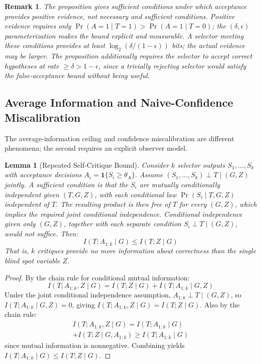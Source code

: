 \documentclass[a4paper,journal]{IAENGtran}
\newtheorem{Lemma}[Theorem]{Lemma}
\newtheorem{Remark}[Theorem]{Remark}
\begin{document}
\begin{Remark}
The proposition gives \emph{sufficient} conditions under which acceptance provides positive
evidence, not necessary and sufficient conditions. Positive evidence requires only
$\Pr(A=1 \mid T=1) > \Pr(A=1 \mid T=0)$; the $(\delta, \epsilon)$ parameterization makes
the bound explicit and measurable. A selector meeting these conditions provides at least
$\log_2(\delta/(1-\epsilon))$ bits; the actual evidence may be larger. The proposition
additionally requires the selector to accept correct hypotheses at rate $\geq \delta >
1-\epsilon$, since a trivially rejecting selector would satisfy the false-acceptance bound
without being useful.
\end{Remark}

\subsection{Average Information and Naive-Confidence Miscalibration}

The average-information ceiling and confidence miscalibration are different phenomena;
the second requires an explicit observer model.

\begin{Lemma}[Repeated Self-Critique Bound]
\label{lem:repeated}
Consider $k$ selector outputs $S_1, \ldots, S_k$ with acceptance decisions
$A_i = \mathbf{1}\{S_i \geq \theta_A\}$. Assume $(S_1, \ldots, S_k) \perp T \mid (G, Z)$
jointly. A sufficient condition is that the $S_i$ are mutually conditionally independent
given $(T,G,Z)$, with each conditional law $\Pr(S_i\mid T,G,Z)$ independent of $T$.
The resulting product is then free of $T$ for every $(G,Z)$, which implies the required
joint conditional independence. Conditional independence given only $(G,Z)$, together with
each separate condition $S_i\perp T\mid(G,Z)$, would not suffice. Then:
\begin{equation}
I(T; A_{1:k} \mid G) \leq I(T; Z \mid G)
\end{equation}
That is, $k$ critiques provide no more information about correctness than the single blind
spot variable $Z$.
\end{Lemma}

\begin{proof}
By the chain rule for conditional mutual information:
\begin{equation}
I(T; A_{1:k}, Z \mid G) = I(T; Z \mid G) + I(T; A_{1:k} \mid G, Z)
\end{equation}
Under the joint conditional independence assumption, $A_{1:k} \perp T \mid (G, Z)$, so
$I(T; A_{1:k} \mid G, Z) = 0$, giving $I(T; A_{1:k}, Z \mid G) = I(T; Z \mid G)$.
Also by the chain rule:
\begin{multline}
I(T; A_{1:k}, Z \mid G) = I(T; A_{1:k} \mid G) \\
+ I(T; Z \mid G, A_{1:k}) \geq I(T; A_{1:k} \mid G)
\end{multline}
since mutual information is nonnegative. Combining yields $I(T; A_{1:k} \mid G) \leq I(T; Z \mid G)$. 
\end{proof}
\end{document}

